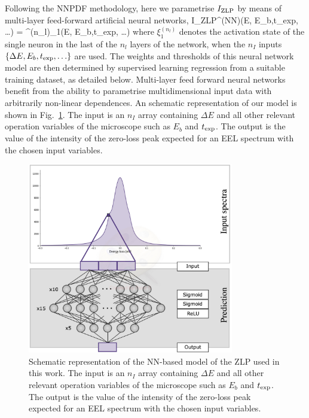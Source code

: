 Following the NNPDF methodology, here we parametrise $I_{\rm ZLP}$ by means of
multi-layer feed-forward artificial neural networks,
\be
I_{\rm ZLP}^{\rm (NN)}(\Delta E, E_{b},t_{\rm exp}, \ldots)  = \xi^{(n_l)}_1(\Delta E, E_{b},t_{\rm exp}, \ldots)
\ee
where $\xi^{(n_l)}_1$ denotes the activation state of the single neuron in the last
of the $n_l$ layers of the network, when the $n_I$ inputs $\{ \Delta E, E_{b},t_{\rm exp}, \ldots \}$
are used.
%
The weights and thresholds of this neural network model are then determined
by supervised learning regression from a suitable training dataset, as
detailed below.
%
Multi-layer feed forward neural networks benefit from the ability
to parametrise multidimensional input data with arbitrarily
non-linear dependences.
%
An schematic representation of our model
is shown in Fig.~\ref{fig:architecture}.
%
 The input is an $n_I$ array containing $\Delta E$ and all other relevant
      operation variables of the microscope such as $E_b$ and $t_{\rm exp}$.
      The output is the value of the intensity of the zero-loss peak
      expected for an EEL spectrum with the chosen input variables.

\begin{figure}[h]
    \centering
    \includegraphics[width=90mm]{plots/architecture.jpg}
    \caption{Schematic representation of the NN-based model of the ZLP used
      in this work.
      The input is an $n_I$ array containing $\Delta E$ and all other relevant
      operation variables of the microscope such as $E_b$ and $t_{\rm exp}$.
      The output is the value of the intensity of the zero-loss peak
      expected for an EEL spectrum with the chosen input variables.
    }
    \label{fig:architecture}
\end{figure}



